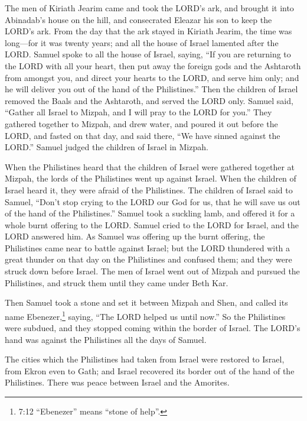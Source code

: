  The men of Kiriath Jearim came and took the LORD's ark, and
brought it into Abinadab's house on the hill, and consecrated Eleazar
his son to keep the LORD's ark.  From the day that the ark
stayed in Kiriath Jearim, the time was long---for it was twenty years;
and all the house of Israel lamented after the LORD.  Samuel
spoke to all the house of Israel, saying, ``If you are returning to the
LORD with all your heart, then put away the foreign gods and the
Ashtaroth from amongst you, and direct your hearts to the LORD, and
serve him only; and he will deliver you out of the hand of the
Philistines.''  Then the children of Israel removed the
Baals and the Ashtaroth, and served the LORD only.  Samuel
said, ``Gather all Israel to Mizpah, and I will pray to the LORD for
you.''  They gathered together to Mizpah, and drew water,
and poured it out before the LORD, and fasted on that day, and said
there, ``We have sinned against the LORD.'' Samuel judged the children
of Israel in Mizpah.

 When the Philistines heard that the children of Israel were
gathered together at Mizpah, the lords of the Philistines went up
against Israel. When the children of Israel heard it, they were afraid
of the Philistines.  The children of Israel said to Samuel,
``Don't stop crying to the LORD our God for us, that he will save us out
of the hand of the Philistines.''  Samuel took a suckling
lamb, and offered it for a whole burnt offering to the LORD. Samuel
cried to the LORD for Israel, and the LORD answered him. 
As Samuel was offering up the burnt offering, the Philistines came near
to battle against Israel; but the LORD thundered with a great thunder on
that day on the Philistines and confused them; and they were struck down
before Israel.  The men of Israel went out of Mizpah and
pursued the Philistines, and struck them until they came under Beth Kar.

 Then Samuel took a stone and set it between Mizpah and
Shen, and called its name Ebenezer,\footnote{7:12 ``Ebenezer'' means
  ``stone of help''.} saying, ``The LORD helped us until now.''
 So the Philistines were subdued, and they stopped coming
within the border of Israel. The LORD's hand was against the Philistines
all the days of Samuel.

 The cities which the Philistines had taken from Israel
were restored to Israel, from Ekron even to Gath; and Israel recovered
its border out of the hand of the Philistines. There was peace between
Israel and the Amorites.


